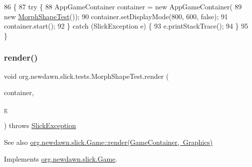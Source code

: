 \begin{DoxyCode}
86                                            \{
87         \textcolor{keywordflow}{try} \{
88             AppGameContainer container = \textcolor{keyword}{new} AppGameContainer(
89                     \textcolor{keyword}{new} \mbox{\hyperlink{classorg_1_1newdawn_1_1slick_1_1tests_1_1_morph_shape_test_a3ca260cc9a60e9cc306dd7e3b2ac1b2b}{MorphShapeTest}}());
90             container.setDisplayMode(800, 600, \textcolor{keyword}{false});
91             container.start();
92         \} \textcolor{keywordflow}{catch} (SlickException e) \{
93             e.printStackTrace();
94         \}
95     \}
\end{DoxyCode}
\mbox{\label{classorg_1_1newdawn_1_1slick_1_1tests_1_1_morph_shape_test_ad4d73a067bb52aad3f9a5c08220e1250}} 
\subsubsection{\texorpdfstring{render()}{render()}}
{\footnotesize\ttfamily void org.\+newdawn.\+slick.\+tests.\+Morph\+Shape\+Test.\+render (\begin{DoxyParamCaption}\item[{\mbox{\hyperlink{classorg_1_1newdawn_1_1slick_1_1_game_container}{Game\+Container}}}]{container,  }\item[{\mbox{\hyperlink{classorg_1_1newdawn_1_1slick_1_1_graphics}{Graphics}}}]{g }\end{DoxyParamCaption}) throws \mbox{\hyperlink{classorg_1_1newdawn_1_1slick_1_1_slick_exception}{Slick\+Exception}}\hspace{0.3cm}{\ttfamily [inline]}}

\begin{DoxySeeAlso}{See also}
\mbox{\hyperlink{interfaceorg_1_1newdawn_1_1slick_1_1_game_af1a4670d43eb3ba04dfcf55ab1975b64}{org.\+newdawn.\+slick.\+Game\+::render(\+Game\+Container, Graphics)}} 
\end{DoxySeeAlso}


Implements \mbox{\hyperlink{interfaceorg_1_1newdawn_1_1slick_1_1_game_af1a4670d43eb3ba04dfcf55ab1975b64}{org.\+newdawn.\+slick.\+Game}}.


